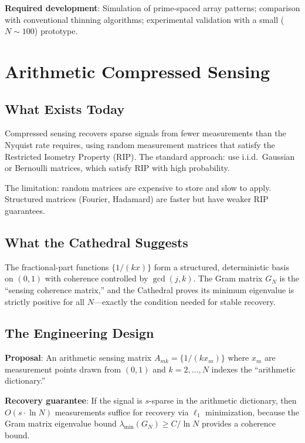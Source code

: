 \documentclass[11pt,a4paper]{article}
\begin{document}
\textbf{Required development}: Simulation of prime-spaced array
patterns; comparison with conventional thinning algorithms;
experimental validation with a small ($N \sim 100$) prototype.

\section{Arithmetic Compressed Sensing}
\label{sec:cs}

\subsection{What Exists Today}

Compressed sensing recovers sparse signals from fewer measurements
than the Nyquist rate requires, using random measurement matrices
that satisfy the Restricted Isometry Property (RIP). The standard
approach: use i.i.d.\ Gaussian or Bernoulli matrices, which satisfy
RIP with high probability.

The limitation: random matrices are expensive to store and slow to
apply. Structured matrices (Fourier, Hadamard) are faster but have
weaker RIP guarantees.

\subsection{What the Cathedral Suggests}

The fractional-part functions $\{1/(kx)\}$ form a structured,
deterministic basis on $(0,1)$ with coherence controlled by
$\gcd(j,k)$. The Gram matrix $G_N$ is the ``sensing coherence
matrix,'' and the Cathedral proves its minimum eigenvalue is
strictly positive for all $N$---exactly the condition needed for
stable recovery.

\subsection{The Engineering Design}

\textbf{Proposal}: An arithmetic sensing matrix
$A_{mk} = \{1/(k x_m)\}$ where $x_m$ are measurement points drawn
from $(0,1)$ and $k = 2, \ldots, N$ indexes the ``arithmetic
dictionary.''

\textbf{Recovery guarantee}: If the signal is $s$-sparse in the
arithmetic dictionary, then $O(s \cdot \ln N)$ measurements suffice
for recovery via $\ell_1$ minimization, because the Gram matrix
eigenvalue bound $\lambda_{\min}(G_N) \geq C / \ln N$ provides a
coherence bound.
\end{document}
